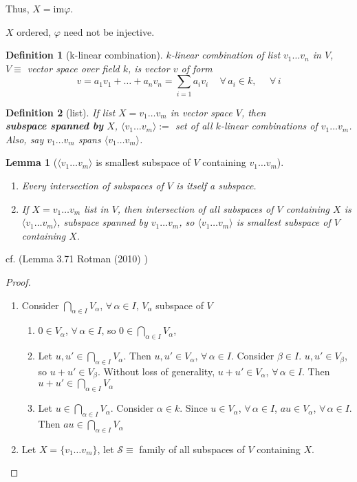 \documentclass[10pt]{amsart}
\newtheorem{lemma}{Lemma}
\newtheorem{definition}{Definition}
\begin{document}
\begin{multicols*}{2}
Thus, $X = \text{im}\varphi$.

$X$ ordered, $\varphi$ need not be injective. 

\begin{definition}[k-linear combination]
	$k$-linear combination of list $v_1\dots v_n$ in $V$, $V\equiv $ vector space over field $k$, is vector $v$ of form 
	\[
	v = a_1 v_1 + \dots + a_n v_n  = \sum_{i=1} a_i v_i \quad \, \forall \, a_i \in k, \, \quad \, \forall \, i
	\]
\end{definition}

\begin{definition}[list]
	If list $X = v_1 \dots v_m$ in vector space $V$, then \\
	\textbf{subspace spanned by } $X$, $\langle v_1 \dots v_m \rangle := $ set of all $k$-linear combinations of $v_1 \dots v_m$.  Also, say $v_1 \dots v_m $ spans $\langle v_1 \dots v_m\rangle$. 
\end{definition}

\begin{lemma}[$\langle v_1 \dots v_m \rangle$ is smallest subspace of $V$ containing $v_1\dots v_m$]\label{Lemma:smallest_subspace}
\begin{enumerate}
	\item[(i)] Every intersection of subspaces of $V$ is itself a subspace.
	\item[(ii)] If $X= v_1 \dots v_m$ list in $V$, then intersection of all subspaces of $V$ containing $X$ is $\langle v_1 \dots v_m \rangle$, subspace spanned by $v_1\dots v_m$, so $\langle v_1 \dots v_m \rangle$ is smallest subspace of $V$ containing $X$. 
\end{enumerate}
\end{lemma}
cf. (Lemma 3.71 Rotman (2010) \cite{JRotman2010}) 

\begin{proof}
\begin{enumerate}
	\item[(i)] Consider $\bigcap_{\alpha \in I} V_{\alpha}$, $\forall \, \alpha \in I$, $V_{\alpha} $ subspace of $V$
	\begin{enumerate}
		\item[(i)] $0\in V_{\alpha}$, $\forall \, \alpha \in I$, so $0\in \bigcap_{\alpha \in I} V_{\alpha}$,
		\item[(ii)] Let $u,u' \in \bigcap_{\alpha \in I} V_{\alpha}$. Then $u,u' \in V_{\alpha}$, $\forall \, \alpha \in I$. Consider $\beta \in I$. $u, u' \in V_{\beta}$, so $u+u' \in V_{\beta}$.  Without loss of generality, $u + u' \in V_{\alpha}$, $\forall \, \alpha \in I$.  Then $u+u' \in \bigcap_{\alpha \in I} V_{\alpha}$
		\item[(iii)] Let $u\in \bigcap_{\alpha \in I} V_{\alpha}$.  Consider $\alpha \in k$. Since $u\in V_{\alpha}$, $\forall \, \alpha \in I$, $au\in V_{\alpha}$, $\forall \, \alpha \in I$.  \\
		Then $au \in \bigcap_{\alpha \in I} V_{\alpha}$
	\end{enumerate}
\item[(ii)] Let $X = \lbrace v_1 \dots v_m \rbrace$, let $\mathcal{S} \equiv $ family of all subspaces of $V$ containing $X$. 


\end{enumerate}
\end{proof}
\end{multicols*}
\end{document}
